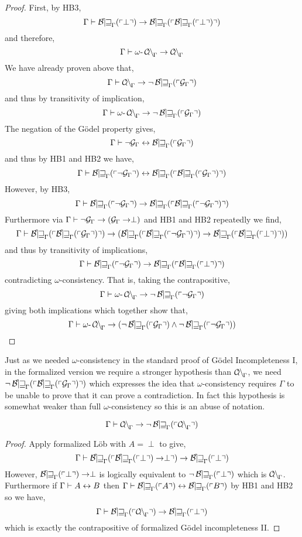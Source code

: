 \documentclass[12pt]{article}
\begin{document}
\begin{proof}
First, by HB3,
\[ \Gamma \proves \Thm{\perp} \to \Thm{\Thm{\perp}} \]
and therefore,
\[ \Gamma \proves \oCon \to \Con_{\Gamma} \]
We have already proven above that,
\[ \Gamma \proves \Con_{\Gamma} \to \neg \Thm{\G{\Gamma}} \]
and thus by transitivity of implication,
\[ \Gamma \proves \oCon \to \neg \Thm{\G{\Gamma}} \]
The negation of the G\"{o}del property gives,
\[ \Gamma \proves \neg \G{\Gamma} \leftrightarrow \Thm{\G{\Gamma}} \]
and thus by HB1 and HB2 we have,
\[ \Gamma \proves \Thm{\neg \G{\Gamma}} \leftrightarrow \Thm{\Thm{\G{\Gamma}}} \]
However, by HB3,
\[ \Gamma \proves \Thm{\neg \G{\Gamma}} \to \Thm{\Thm{\neg \G{\Gamma}}} \]
Furthermore via $\Gamma \proves \neg \G{\Gamma} \to (\G{\Gamma} \to \perp)$ and HB1 and HB2 repeatedly we find,
\[ \Gamma \proves \Thm{\Thm{\G{\Gamma}}} \to (\Thm{\Thm{\neg \G{\Gamma}}} \to \Thm{\Thm{\perp}}) \]
and thus by transitivity of implications,
\[ \Gamma \proves \Thm{\neg \G{\Gamma}} \to \Thm{\Thm{\perp}} \]
contradicting $\omega$-consistency. That is, taking the contrapositive,
\[ \Gamma \proves \oCon \to \neg \Thm{\neg \G{\Gamma}} \]
giving both implications which together show that,
\[ \Gamma \proves \oCon \to (\neg \Thm{\G{\Gamma}} \wedge \neg \Thm{\neg \G{\Gamma}}) \]
\end{proof}

\begin{remark}
Just as we needed $\omega$-consistency in the standard proof of G\"{o}del Incompleteness I, in the formalized version we require a stronger hypothesis than $\Con_{\Gamma}$, we need $\neg \Thm{\Thm{\G{\Gamma}}}$ which expresses the idea that $\omega$-consistency requires $\Gamma$ to be unable to prove that it can prove a contradiction. In fact this hypothesis is somewhat weaker than full $\omega$-consistency so this is an abuse of notation. 
\end{remark}

\begin{theorem}
\[ \Gamma \proves \Con_{\Gamma} \to \neg \Thm{\Con_{\Gamma}} \]
\end{theorem}

\begin{proof}
Apply formalized L\"{o}b with $A = \perp$ to give,
\[ \Gamma \proves \Thm{\Thm{\perp} \to \perp} \to \Thm{\perp} \]
However, $\Thm{\perp} \to \perp$ is logically equivalent to $\neg \Thm{\perp}$ which is $\Con_{\Gamma}$. Furthermore if $\Gamma \proves A \leftrightarrow B$ then $\Gamma \proves \Thm{A} \leftrightarrow \Thm{B}$ by HB1 and HB2 so we have,
\[ \Gamma \proves \Thm{\Con_{\Gamma}} \to \Thm{\perp} \]
which is exactly the contrapositive of formalized G\"{o}del incompleteness II. 
\end{proof}
\end{document}
